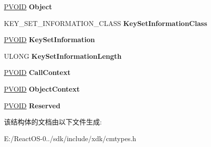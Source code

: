 \begin{DoxyCompactItemize}
\item 
\mbox{\label{struct___r_e_g___s_e_t___i_n_f_o_r_m_a_t_i_o_n___k_e_y___i_n_f_o_r_m_a_t_i_o_n_aa559c9750a650a8b11acaa5664c3ed25}} 
\hyperlink{interfacevoid}{P\+V\+O\+ID} {\bfseries Object}
\item 
\mbox{\label{struct___r_e_g___s_e_t___i_n_f_o_r_m_a_t_i_o_n___k_e_y___i_n_f_o_r_m_a_t_i_o_n_a8a98c766ca1372dc08d2e04533a86726}} 
K\+E\+Y\+\_\+\+S\+E\+T\+\_\+\+I\+N\+F\+O\+R\+M\+A\+T\+I\+O\+N\+\_\+\+C\+L\+A\+SS {\bfseries Key\+Set\+Information\+Class}
\item 
\mbox{\label{struct___r_e_g___s_e_t___i_n_f_o_r_m_a_t_i_o_n___k_e_y___i_n_f_o_r_m_a_t_i_o_n_a084152a22b4dcd0668ffac9b91affcf3}} 
\hyperlink{interfacevoid}{P\+V\+O\+ID} {\bfseries Key\+Set\+Information}
\item 
\mbox{\label{struct___r_e_g___s_e_t___i_n_f_o_r_m_a_t_i_o_n___k_e_y___i_n_f_o_r_m_a_t_i_o_n_a0adcb7cf2757127bb73852bd9162618c}} 
U\+L\+O\+NG {\bfseries Key\+Set\+Information\+Length}
\item 
\mbox{\label{struct___r_e_g___s_e_t___i_n_f_o_r_m_a_t_i_o_n___k_e_y___i_n_f_o_r_m_a_t_i_o_n_accba69633839dc9e6493928a4ae0a7fd}} 
\hyperlink{interfacevoid}{P\+V\+O\+ID} {\bfseries Call\+Context}
\item 
\mbox{\label{struct___r_e_g___s_e_t___i_n_f_o_r_m_a_t_i_o_n___k_e_y___i_n_f_o_r_m_a_t_i_o_n_a3a2ddc9b59aed0390adecf6a027b167e}} 
\hyperlink{interfacevoid}{P\+V\+O\+ID} {\bfseries Object\+Context}
\item 
\mbox{\label{struct___r_e_g___s_e_t___i_n_f_o_r_m_a_t_i_o_n___k_e_y___i_n_f_o_r_m_a_t_i_o_n_a171db80a05734c6148bd7d80200d76bd}} 
\hyperlink{interfacevoid}{P\+V\+O\+ID} {\bfseries Reserved}
\end{DoxyCompactItemize}


该结构体的文档由以下文件生成\+:\begin{DoxyCompactItemize}
\item 
E\+:/\+React\+O\+S-\/0../sdk/include/xdk/cmtypes.\+h\end{DoxyCompactItemize}

